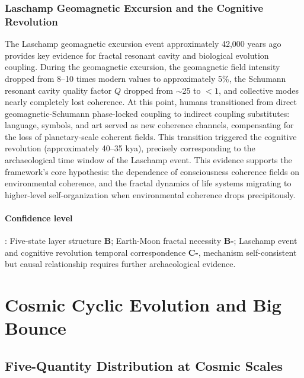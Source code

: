 \documentclass[12pt,a4paper,twocolumn]{article}
\begin{document}
\subsubsection{Laschamp Geomagnetic Excursion and the Cognitive Revolution}
\label{subsec:laschamp}
The Laschamp geomagnetic excursion event approximately 42,000 years ago provides key evidence for fractal resonant cavity and biological evolution coupling. During the geomagnetic excursion, the geomagnetic field intensity dropped from 8--10 times modern values to approximately 5\%, the Schumann resonant cavity quality factor $Q$ dropped from $\sim$25 to $<1$, and collective modes nearly completely lost coherence. At this point, humans transitioned from direct geomagnetic-Schumann phase-locked coupling to indirect coupling substitutes: language, symbols, and art served as new coherence channels, compensating for the loss of planetary-scale coherent fields. This transition triggered the cognitive revolution (approximately 40--35 kya), precisely corresponding to the archaeological time window of the Laschamp event. This evidence supports the framework's core hypothesis: the dependence of consciousness coherence fields on environmental coherence, and the fractal dynamics of life systems migrating to higher-level self-organization when environmental coherence drops precipitously.

\paragraph{Confidence level}: Five-state layer structure \textbf{B}; Earth-Moon fractal necessity \textbf{B-}; Laschamp event and cognitive revolution temporal correspondence \textbf{C-}, mechanism self-consistent but causal relationship requires further archaeological evidence.


\section{Cosmic Cyclic Evolution and Big Bounce}
\label{sec:cosmic_cycle}

\subsection{Five-Quantity Distribution at Cosmic Scales}
\end{document}
